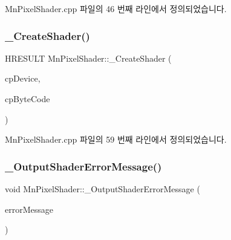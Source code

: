 Mn\+Pixel\+Shader.\+cpp 파일의 46 번째 라인에서 정의되었습니다.

\mbox{\label{class_m_n_l_1_1_mn_pixel_shader_a01cef881b676b0fa699d0cdd0a37b3c9}} 
\subsubsection{\texorpdfstring{\+\_\+\+Create\+Shader()}{\_CreateShader()}}
{\footnotesize\ttfamily H\+R\+E\+S\+U\+LT Mn\+Pixel\+Shader\+::\+\_\+\+Create\+Shader (\begin{DoxyParamCaption}\item[{const \hyperlink{namespace_m_n_l_a1eec210db8f309a4a9ac0d9658784c31}{C\+P\+D3\+D\+Device}}]{cp\+Device,  }\item[{const \hyperlink{namespace_m_n_l_a3716e3bee60c31fe1b7b5dd5a82db59a}{C\+P\+D3\+D\+Blob}}]{cp\+Byte\+Code }\end{DoxyParamCaption})\hspace{0.3cm}{\ttfamily [private]}}



Mn\+Pixel\+Shader.\+cpp 파일의 59 번째 라인에서 정의되었습니다.

\mbox{\label{class_m_n_l_1_1_mn_pixel_shader_aa93bd4d048034eefed2b975c6a0bf8eb}} 
\subsubsection{\texorpdfstring{\+\_\+\+Output\+Shader\+Error\+Message()}{\_OutputShaderErrorMessage()}}
{\footnotesize\ttfamily void Mn\+Pixel\+Shader\+::\+\_\+\+Output\+Shader\+Error\+Message (\begin{DoxyParamCaption}\item[{const \hyperlink{namespace_m_n_l_a3716e3bee60c31fe1b7b5dd5a82db59a}{C\+P\+D3\+D\+Blob}}]{error\+Message }\end{DoxyParamCaption})\hspace{0.3cm}{\ttfamily [private]}}



